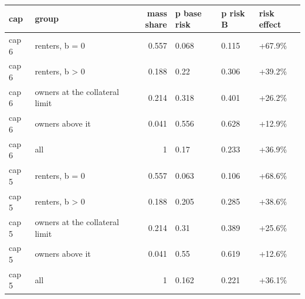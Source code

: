 \begingroup\small
\setlength{\tabcolsep}{3pt}
\renewcommand{\arraystretch}{1.04}
\begin{tabularx}{\linewidth}{XXrXXX}
\toprule
cap & group & mass share & p base risk & p risk B & risk effect \\
\midrule
cap 6 & renters, b = 0 & 0.557 & 0.068 & 0.115 & +67.9\% \\
cap 6 & renters, b \textgreater{} 0 & 0.188 & 0.22 & 0.306 & +39.2\% \\
cap 6 & owners at the collateral limit & 0.214 & 0.318 & 0.401 & +26.2\% \\
cap 6 & owners above it & 0.041 & 0.556 & 0.628 & +12.9\% \\
cap 6 & all & 1 & 0.17 & 0.233 & +36.9\% \\
cap 5 & renters, b = 0 & 0.557 & 0.063 & 0.106 & +68.6\% \\
cap 5 & renters, b \textgreater{} 0 & 0.188 & 0.205 & 0.285 & +38.6\% \\
cap 5 & owners at the collateral limit & 0.214 & 0.31 & 0.389 & +25.6\% \\
cap 5 & owners above it & 0.041 & 0.55 & 0.619 & +12.6\% \\
cap 5 & all & 1 & 0.162 & 0.221 & +36.1\% \\
\bottomrule
\end{tabularx}
\endgroup
